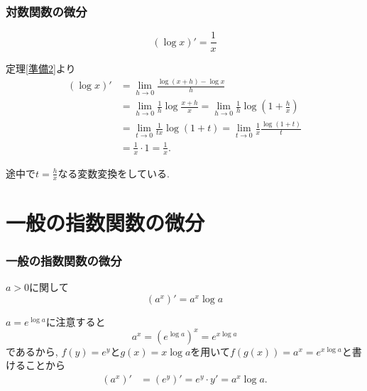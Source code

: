 

\begin{frame}
\frametitle{対数関数の微分}


\begin{Thm} 
$$(\log x)'=\frac{1}{x}$$
\end{Thm}

定理\ref{準備2}より \vspace{-2mm}
\begin{align*} 
(\log x)' &= \lim_{h\to0}\frac{\log(x+h)-\log x}{h} \\
&= \lim_{h\to0}\frac{1}{h} \log \frac{x+h}{x} = \lim_{h\to0}\frac{1}{h} \log (1+\frac{h}{x}) \\
&= \lim_{t\to0}\frac{1}{tx} \log (1+t) = \lim_{t\to0}\frac{1}{x} \frac{\log (1+t)}{t} \\
&=\frac{1}{x}\cdot 1=\frac{1}{x}. 
\end{align*}

途中で$t=\frac{h}{x}$なる変数変換をしている. 

\end{frame}










\section{一般の指数関数の微分}


\begin{frame}
\frametitle{一般の指数関数の微分}


\begin{Thm} 
$a>0$に関して
$$(a^x)'=a^x \log a$$
\end{Thm}

$a=e^{\log a}$に注意すると
$$
a^x=(e^{\log a})^x=e^{x \log a}
$$
であるから, 
$f(y)=e^y$と$g(x)=x \log a$を用いて$f(g(x))=a^x=e^{x \log a}$と書けることから
\begin{align*} 
(a^x)' &= (e^y)'  =e^y \cdot y' =a^x \log a. 
\end{align*}


\end{frame}


